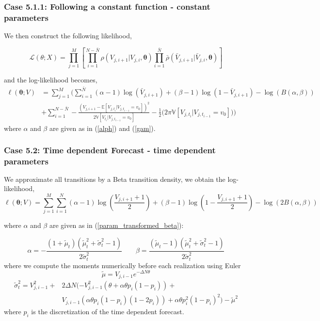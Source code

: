 \documentclass[aspectratio=169]{beamer}\usepackage[utf8]{inputenc}
\newcommand{\E}{\mathbb{E}}
\newcommand{\V}{\mathbb{V}}
\begin{document}
\begin{frame}\frametitle{ Case 5.1.1: Following a constant function - constant parameters }
We then construct the following likelihood,


\begin{equation}
\mathcal{L}(\theta;X) = \prod\limits_{j=1}^M \left[ \prod\limits_{i=1}^{N-\bar{N}}\rho( {V_{j,i+1}|V_{j,i}}, \bm{\theta}) \prod\limits_{i=1}^{\bar{N}} \bar{\rho}( {\bar{V}_{j,i+1}|\bar{V}_{j,i}}, \bm{\theta}) \right]
\end{equation}

and the log-likelihood becomes, 
\begin{equation}
\begin{split}
\ell(\bm{\theta}; V)&= \sum\limits_{j=1}^M \Big(  \sum\limits_{i=1}^{\bar{N}} (\alpha -1)\log(\bar{V}_{j,i+1}) + (\beta -1) \log(1-\bar{V}_{j,i+1}) - \log (B(\alpha, \beta))\\
&+ \sum\limits_{i=1}^{N-\bar{N}} - \frac{(V_{j,i+1}   - \E[V_{j,t_i}| V_{j,t_{i-1}}=v_0] )^2}{2\V[V_{t_i}| V_{j,t_{i-1}}=v_0]} - \frac{1}{2} \Big(2 \pi \V[V_{j,t_i}| V_{j,t_{i-1}}=v_0] \Big) \Big)
\end{split}
\end{equation}
where $\alpha$ and $\beta$ are given as in (\ref{alph}) and (\ref{gam}).

\end{frame}


\begin{frame}\frametitle{ Case 5.2: Time dependent Forecast - time dependent  parameters }
We approximate all transitions by a Beta transition density, we obtain the log-likelihood, 
\begin{equation}
\ell(\bm{\theta}; V)= \sum\limits_{j=1}^M \sum\limits_{i=1}^N (\alpha -1)\log(\frac{V_{j,i+1}+1}{2}) + (\beta -1) \log(1-\frac{V_{j,i+1}+1}{2}) - \log ( 2 B(\alpha, \beta))
\end{equation}

where $\alpha$ and $\beta$ are given as in (\ref{param_transformed_beta}):

\begin{equation}
\alpha = - \frac{(1+\tilde{\mu}_t )(\tilde{\mu}_t^2 + \tilde{\sigma}_t^2 -1)}{2 \tilde{\sigma}_t^2} \quad \quad \beta =  \frac{(\tilde{\mu}_t-1 )(\tilde{\mu}_t^2 + \tilde{\sigma}_t^2 -1)}{2 \tilde{\sigma}_t^2} \label{param_transformed_beta}
\end{equation}
where we compute the moments numerically before each realization using Euler
\begin{equation}
\tilde{\mu} = V_{j,i-1}e^{- \Delta N \theta}
\end{equation}
\begin{equation}
\begin{split}
\tilde{\sigma}_t^2 =  V_{j,i-1}^2 +& 2\Delta N (-V_{j,i-1}^2(\theta+\alpha\theta p_i (1-p_i) )  + \\
& V_{j,i-1}(\alpha\theta p_i(1-p_i)(1-2p_i )) + \alpha\theta p_i^2(1-p_i)^2) - \tilde{\mu}^2
\end{split}
\end{equation}
where $p_i$ is the discretization of the time dependent forecast.

\end{frame}
\end{document}
